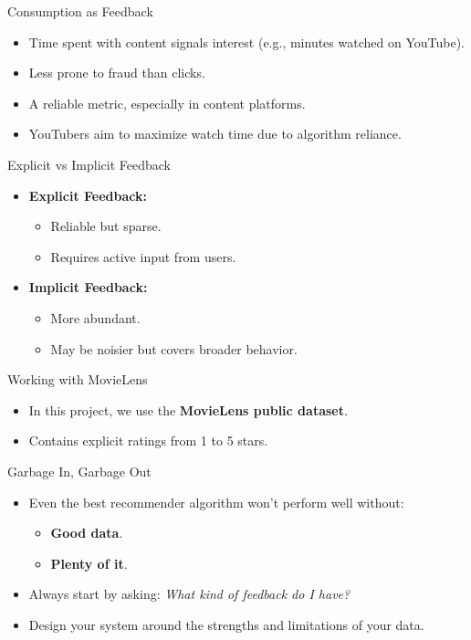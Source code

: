 \documentclass{beamer}
\begin{document}
\begin{frame}{Consumption as Feedback}
\begin{itemize}
    \item Time spent with content signals interest (e.g., minutes watched on YouTube).
    \item Less prone to fraud than clicks.
    \item A reliable metric, especially in content platforms.
    \item YouTubers aim to maximize watch time due to algorithm reliance.
\end{itemize}
\end{frame}

\begin{frame}{Explicit vs Implicit Feedback}
\begin{itemize}
    \item \textbf{Explicit Feedback:}
    \begin{itemize}
        \item Reliable but sparse.
        \item Requires active input from users.
    \end{itemize}
    \item \textbf{Implicit Feedback:}
    \begin{itemize}
        \item More abundant.
        \item May be noisier but covers broader behavior.
    \end{itemize}
\end{itemize}
\end{frame}

\begin{frame}{Working with MovieLens}
\begin{itemize}
    \item In this project, we use the \textbf{MovieLens public dataset}.
    \item Contains explicit ratings from 1 to 5 stars.
\end{itemize}
\end{frame}

\begin{frame}{Garbage In, Garbage Out}
\begin{itemize}
    \item Even the best recommender algorithm won't perform well without:
    \begin{itemize}
        \item \textbf{Good data}.
        \item \textbf{Plenty of it}.
    \end{itemize}
    \item Always start by asking: \textit{What kind of feedback do I have?}
    \item Design your system around the strengths and limitations of your data.
\end{itemize}
\end{frame}
\end{document}
